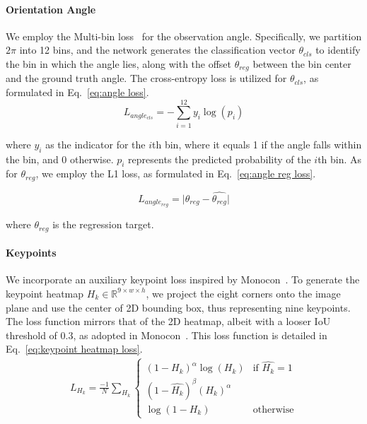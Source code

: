 \documentclass[journal]{IEEEtran}
\newcommand{\R}{\mathbb{R}}
\begin{document}
	\paragraph{Orientation Angle}
	We employ the Multi-bin loss~\cite{geometry3d} for the observation angle. Specifically, we partition $2 \pi$ into 12 bins, and the network generates the classification vector $\theta_{cls}$ to identify the bin in which the angle lies, along with the offset $\theta_{reg}$ between the bin center and the ground truth angle. The cross-entropy loss is utilized for $\theta_{cls}$, as formulated in Eq.~\eqref{eq:angle loss}.
	\begin{equation} 
		L_{angle_{cls}} = -\sum_{i=1}^{12} y_{i}\log(p_{i})
		\label{eq:angle loss}
	\end{equation}

	where $y_i$ as the indicator for the $i$th bin, where it equals 1 if the angle falls within the bin, and 0 otherwise. $p_i$ represents the predicted probability of the $i$th bin. As for $\theta_{reg}$, we employ the L1 loss, as formulated in Eq.~\eqref{eq:angle reg loss}.
	
	
	\begin{equation} 
		L_{angle_{reg}} = \lvert \theta_{reg} - \hat{\theta_{reg}} \rvert
		\label{eq:angle reg loss}
	\end{equation}

	where $\hat{\theta_{reg}}$ is the regression target.
	
	\paragraph{Keypoints}
	We incorporate an auxiliary keypoint loss inspired by Monocon~\cite{monocon}. To generate the keypoint heatmap $H_k \in \R^{9 \times w \times h}$, we project the eight corners onto the image plane and use the center of 2D bounding box, thus representing nine keypoints. The loss function mirrors that of the 2D heatmap, albeit with a looser IoU threshold of 0.3, as adopted in Monocon~\cite{monocon}. This loss function is detailed in Eq.~\eqref{eq:keypoint heatmap loss}.
	\begin{equation}
	\begin{split}
		L_{H_k}=\frac{-1}N\sum_{H_k}\begin{cases}(1-H_k)^\alpha\log(H_k)&\text{if }\hat{H_k}=1\\(1-\hat{H_k})^\beta({H_k})^\alpha \\ \log(1-{H_k}) &\text{otherwise}\end{cases}
		\label{eq:keypoint heatmap loss}
	\end{split}
	\end{equation}
	
\end{document}
